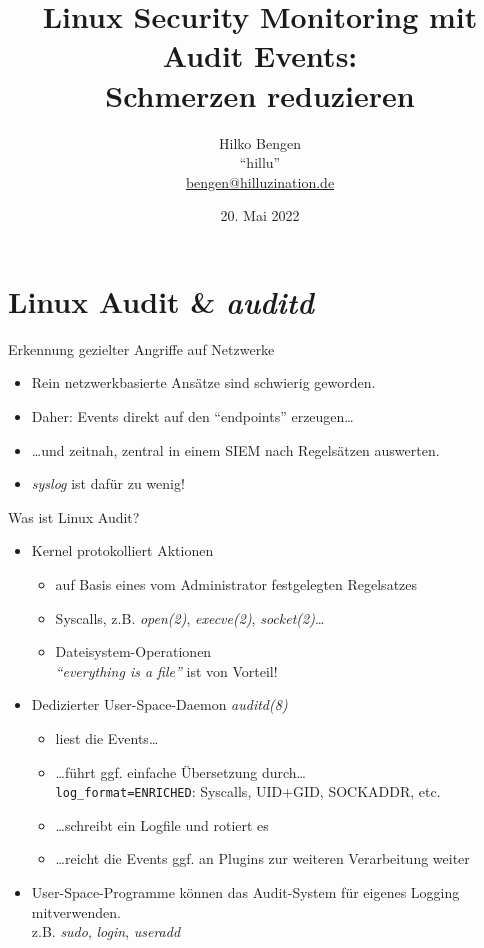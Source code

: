 \documentclass[xcolor={dvipsnames},aspectratio=169]{beamer}
\title{Linux Security Monitoring mit Audit Events:\\Schmerzen reduzieren}
\author{Hilko Bengen\\ ``hillu''\\\url{bengen@hilluzination.de}}
\date{20. Mai 2022}
\begin{document}
\begin{frame}
  \titlepage
\end{frame}
\section{Linux Audit \& \emph{auditd}}
\begin{frame}{Erkennung gezielter Angriffe auf Netzwerke}
  \begin{itemize}
  \item Rein netzwerkbasierte Ansätze sind schwierig geworden.
  \item Daher: Events direkt auf den ``endpoints'' erzeugen\dots
  \item \dots und zeitnah, zentral in einem SIEM nach Regelsätzen auswerten.
  \item \emph{syslog} ist dafür zu wenig!
  \end{itemize}
\end{frame}
\begin{frame}{Was ist Linux Audit?}
  \begin{itemize}
  \item Kernel protokolliert Aktionen
    \begin{itemize}
    \item auf Basis eines vom Administrator festgelegten Regelsatzes
    \item Syscalls, z.B. \emph{open(2)}, \emph{execve(2)}, \emph{socket(2)}\dots
    \item Dateisystem-Operationen\\\emph{``everything is a file''} ist von Vorteil!
    \end{itemize}
  \item Dedizierter User-Space-Daemon \emph{auditd(8)}
    \begin{itemize}
    \item liest die Events\dots
    \item \dots führt ggf. einfache Übersetzung durch\dots\\
      {\footnotesize{}\texttt{log\_format=ENRICHED}: Syscalls, UID+GID, SOCKADDR, etc.}
    \item \dots schreibt ein Logfile und rotiert es
    \item \dots reicht die Events ggf. an Plugins zur weiteren Verarbeitung weiter
    \end{itemize}
  \item User-Space-Programme können das Audit-System für eigenes Logging mitverwenden.\\
    z.B. \emph{sudo}, \emph{login}, \emph{useradd}
  \end{itemize}
\end{frame}
\end{document}
